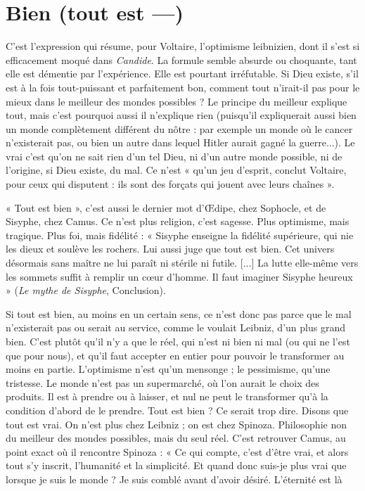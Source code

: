 \section{Bien (tout est —)}
C'est l’expression qui résume, pour Voltaire, l’optimisme
leibnizien, dont il s’est si efficacement moqué
dans {\it Candide}. La formule semble absurde ou choquante, tant elle est démentie
par l'expérience. Elle est pourtant irréfutable. Si Dieu existe, s’il est à la fois
tout-puissant et parfaitement bon, comment tout n'irait-il pas pour le mieux
dans le meilleur des mondes possibles ? Le principe du meilleur explique tout,
mais c’est pourquoi aussi il n’explique rien (puisqu'il expliquerait aussi bien un
monde complètement différent du nôtre : par exemple un monde où le cancer
n’existerait pas, ou bien un autre dans lequel Hitler aurait gagné la guerre...).
Le vrai c’est qu’on ne sait rien d’un tel Dieu, ni d’un autre monde possible, ni
de l’origine, si Dieu existe, du mal. Ce n’est « qu’un jeu d’esprit, conclut Voltaire,
pour ceux qui disputent : ils sont des forçats qui jouent avec leurs
chaînes ».

« Tout est bien », c’est aussi le dernier mot d'Œdipe, chez Sophocle, et de
Sisyphe, chez Camus. Ce n’est plus religion, c’est sagesse. Plus optimisme, mais
tragique. Plus foi, mais fidélité : « Sisyphe enseigne la fidélité supérieure, qui
nie les dieux et soulève les rochers. Lui aussi juge que tout est bien. Cet univers
désormais sans maître ne lui paraît ni stérile ni futile. [...] La lutte elle-même
vers les sommets suffit à remplir un cœur d’homme. Il faut imaginer Sisyphe
heureux » ({\it Le mythe de Sisyphe}, Conclusion).

Si tout est bien, au moins en un certain sens, ce n’est donc pas parce que le
mal n’existerait pas ou serait au service, comme le voulait Leibniz, d’un plus
grand bien. C’est plutôt qu’il n’y a que le réel, qui n’est ni bien ni mal (ou qui
ne l’est que pour nous), et qu’il faut accepter en entier pour pouvoir le transformer
au moins en partie. L’optimisme n’est qu’un mensonge ; le pessimisme,
qu’une tristesse. Le monde n’est pas un supermarché, où l’on aurait le choix des
produits. Il est à prendre ou à laisser, et nul ne peut le transformer qu’à la
condition d’abord de le prendre. Tout est bien ? Ce serait trop dire. Disons que
tout est vrai. On n’est plus chez Leibniz ; on est chez Spinoza. Philosophie non
du meilleur des mondes possibles, mais du seul réel. C’est retrouver Camus, au
point exact où il rencontre Spinoza : « Ce qui compte, c’est d’être vrai, et alors
tout s’y inscrit, l'humanité et la simplicité. Et quand donc suis-je plus vrai que
lorsque je suis le monde ? Je suis comblé avant d’avoir désiré. L’éternité est là

